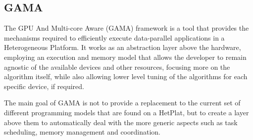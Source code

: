 \subsection{GAMA}
\label{sec:gama}

The GPU And Multi-core Aware (GAMA) framework is a tool that provides the mechanisms required to efficiently execute data-parallel applications in a Heterogeneous Platform. It works as an abstraction layer above the hardware, employing an execution and memory model that allows the developer to remain agnostic of the available devices and other resources, focusing more on the algorithm itself, while also allowing lower level tuning of the algorithms for each specific device, if required.

The main goal of GAMA is not to provide a replacement to the current set of different programming models that are found on a HetPlat, but to create a layer above them to automatically deal with the more generic aspects such as task scheduling, memory management and coordination.



